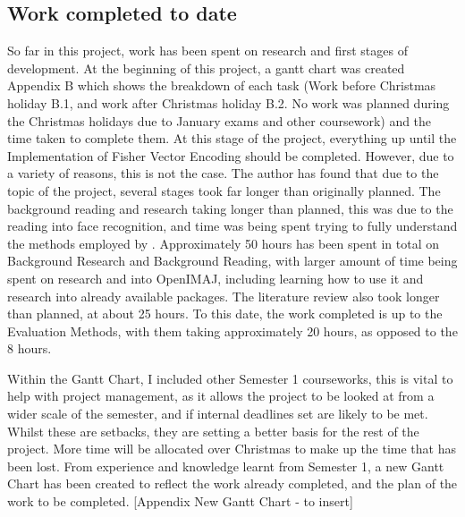 \documentclass[12pt, a4paper]{article}
\begin{document}
\subsection{Work completed to date}
So far in this project, work has been spent on research and first stages of development. At the beginning of this project, a gantt chart was created Appendix B which shows the breakdown of each task (Work before Christmas holiday B.1, and work after Christmas holiday B.2. No work was planned during the Christmas holidays due to January exams and other coursework) and the time taken to complete them. At this stage of the project, everything up until the Implementation of Fisher Vector Encoding should be completed. However, due to a variety of reasons, this is not the case. The author has found that due to the topic of the project, several stages took far longer than originally planned. The background reading and research  taking longer than planned, this was due to the reading into face recognition, and time was being spent trying to fully understand the methods employed by \cite{simonyan2004fisher}. Approximately 50 hours has been spent in total on Background Research and Background Reading, with larger amount of time being spent on research and into OpenIMAJ, including learning how to use it and research into already available packages. The literature review also took longer than planned, at about 25 hours. To this date, the work completed is up to the Evaluation Methods, with them taking approximately 20 hours, as opposed to the 8 hours. 

Within the Gantt Chart, I included other Semester 1 courseworks, this is vital to help with project management, as it allows the project to be looked at from a wider scale of the semester, and if internal deadlines set are likely to be met.
Whilst these are setbacks, they are setting a better basis for the rest of the project. More time will be allocated over Christmas to make up the time that has been lost. From experience and knowledge learnt from Semester 1, a new Gantt Chart has been created to reflect the work already completed, and the plan of the work to be completed. [Appendix New Gantt Chart - to insert]
\end{document}
